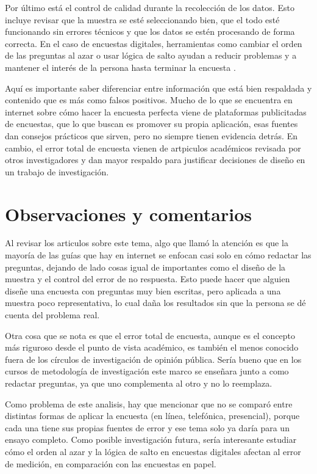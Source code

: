 \documentclass[12pt,letterpaper]{article}
\begin{document}
Por último está el control de calidad durante la recolección de los datos. Esto incluye revisar que la muestra se esté seleccionando bien, que el todo esté funcionando sin errores técnicos y que los datos se estén procesando de forma correcta. En el caso de encuestas digitales, herramientas como cambiar el orden de las preguntas al azar o usar lógica de salto ayudan a reducir problemas y a mantener el interés de la persona hasta terminar la encuesta .

Aquí es importante saber diferenciar entre información que está bien respaldada y contenido que es más como falsos positivos. Mucho de lo que se encuentra en internet sobre cómo hacer la encuesta perfecta viene de plataformas publicitadas de encuestas, que lo que buscan es promover su propia aplicación, esas fuentes dan consejos prácticos que sirven, pero no siempre tienen evidencia detrás. En cambio, el error total de encuesta vienen de artpiculos académicos revisada por otros investigadores y dan mayor respaldo para justificar decisiones de diseño en un trabajo de investigación.

\section*{Observaciones y comentarios}

Al revisar los articulos sobre este tema, algo que llamó la atención es que la mayoría de las guías  que hay en internet se enfocan casi solo en cómo redactar las preguntas, dejando de lado cosas igual de importantes como el diseño de la muestra y el control del error de no respuesta. Esto puede hacer que alguien diseñe una encuesta con preguntas muy bien escritas, pero aplicada a una muestra poco representativa, lo cual daña los resultados sin que la persona se dé cuenta del problema real.

Otra cosa que se nota es que el error total de encuesta, aunque es el concepto más riguroso desde el punto de vista académico, es también el menos conocido fuera de los círculos de investigación de opinión pública. Sería bueno que en los cursos de metodología de investigación este marco se enseñara junto a como redactar preguntas, ya que uno complementa al otro y no lo reemplaza.

Como problema de este analisis, hay que mencionar que no se comparó entre distintas formas de aplicar la encuesta (en línea, telefónica, presencial), porque cada una tiene sus propias fuentes de error y ese tema solo ya daría para un ensayo completo. Como posible investigación futura, sería interesante estudiar cómo el orden al azar y la lógica de salto en encuestas digitales afectan al error de medición, en comparación con las encuestas en papel.
\end{document}
